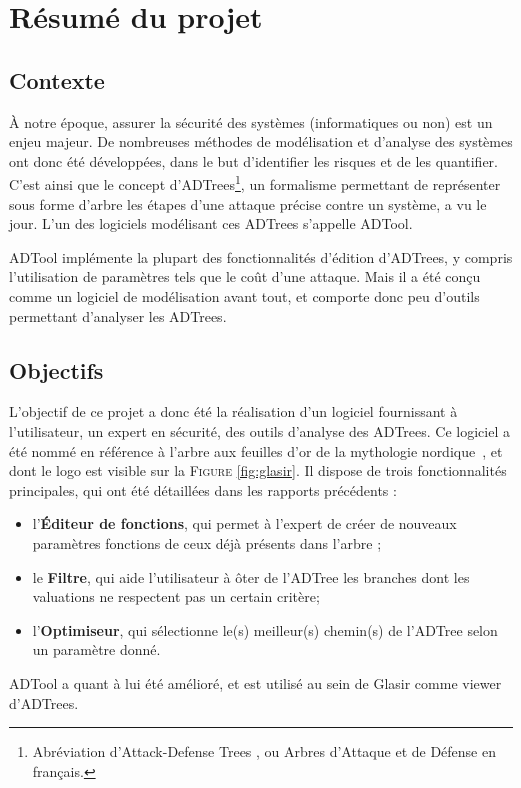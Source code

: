 \section{Résumé du projet}
\label{sec:sumup}

\subsection{Contexte}
\label{ssec:contexte}

    À notre époque, assurer la sécurité des systèmes (informatiques ou non) est un enjeu majeur. De nombreuses méthodes de modélisation et d'analyse des systèmes ont donc été développées, dans le but d'identifier les risques et de les quantifier. C'est ainsi que le concept d'ADTrees\footnote{Abréviation d'\og Attack-Defense Trees \fg{}, ou \og Arbres d'Attaque et de Défense\fg{} en français.}, un formalisme permettant de représenter sous forme d'arbre les étapes d'une attaque précise contre un système, a vu le jour. L'un des logiciels modélisant ces ADTrees s'appelle ADTool.

    ADTool implémente la plupart des fonctionnalités d'édition d'ADTrees, y compris l'utilisation de paramètres tels que le coût d'une attaque. Mais il a été conçu comme un logiciel de modélisation avant tout, et comporte donc peu d'outils permettant d'analyser les ADTrees.

\subsection{Objectifs}
\label{ssec:objectifs}

    L'objectif de ce projet a donc été la réalisation d'un logiciel fournissant à l'utilisateur, un expert en sécurité, des outils d'analyse des ADTrees. Ce logiciel a été nommé \glasir{} en référence à l'arbre aux feuilles d'or de la mythologie nordique~\cite{vikingCulture}, et dont le logo est visible sur la \textsc{Figure} \ref{fig:glasir}. Il dispose de trois fonctionnalités principales, qui ont été détaillées dans les rapports précédents :
\begin{itemize}
    	\item l'{\bf Éditeur de fonctions}, qui permet à l'expert de créer de nouveaux paramètres fonctions de ceux déjà présents dans l'arbre ;
    	\item le {\bf Filtre}, qui aide l'utilisateur à ôter de l'ADTree les branches dont les valuations ne respectent pas un certain critère;
    	\item l'{\bf Optimiseur}, qui sélectionne le(s) meilleur(s) chemin(s) de l'ADTree selon un paramètre donné.
\end{itemize} 
    ADTool a quant à lui été amélioré, et est utilisé au sein de Glasir comme viewer d'ADTrees. 


